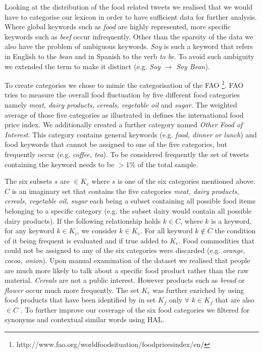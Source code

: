 Looking at the distribution of the food related tweets we realised that we would have to categorise our lexicon in order to have sufficient data for further analysis. Where global keywords such as \emph{food} are highly represented, more specific keywords such as \emph{beef} occur infrequently. Other than the sparsity of the data we also have the problem of ambiguous keywords. \emph {Soy} is such a keyword that refers in English to the \emph{bean} and in Spanish to the verb \emph{to be}. To avoid such ambiguity we extended the term to make it distinct (e.g. \emph{Soy} $\to$  \emph{Soy Bean}). 

To create categories we chose to mimic the categorisation of the FAO  \footnote{http://www.fao.org/worldfoodsituation/foodpricesindex/en/}. FAO tries to measure the overall food fluctuation by five different food categories namely \emph{meat, dairy products, cereals, vegetable oil} and \emph {sugar}. The weighted average of those five categories as illustrated in \cite{fao13}  defines the international food price index. We additionally created a further category named \emph{Other Food of Interest}. This category contains general keywords (e.g. \emph{food, dinner or lunch}) and food keywords that cannot be assigned to one of the five categories, but frequently occur (e.g. \emph {coffee, tea}). To be considered frequently the set of tweets containing the keyword needs to be $> 1\%$ of the total sample. 

The six subsets  $s$ are $\in K_e$ where $s$ is one of the six categories mentioned above. $C$ is an imaginary set that contains the five categories \emph{meat, dairy products, cereals, vegetable oil, sugar}  each being a subset containing all possible food items belonging to a specific category (e.g. the subset dairy would contain all possible dairy products). If the following relationship holds  $k \in C$, where $k$ is a keyword, for any keyword $k \in K_i$, we consider $k \in K_e$. For all keyword $k \notin C$ the condition of it being frequent is evaluated and if true added to $K_e$.  Food commodities that could not be assigned to any of the six categories were discarded (e.g. \emph {orange, cocoa, onion}). Upon manual examination of the dataset we realised that people are much more likely to talk about a specific food product rather than the raw material. \emph{Cereals} are not a public interest. However products such as \emph{bread} or \emph {flower} occur much more frequently. The set $K_e$  was further enriched by using food products that have been identified by \cite{AbbarMW14} in set $K_f$ only $\forall$ $k   \in K_f$ that are also $\in C$ . To further improve our coverage of the six food categories we filtered for synonyms and contextual similar words using HAL. 
